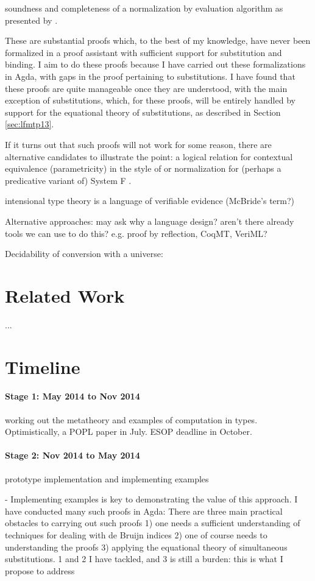 \documentclass{article}
\begin{document}
soundness and completeness of a normalization by evaluation algorithm
as presented by \cite{Dybjer00}. 

These are substantial proofs which, to the best of my knowledge, have never been
formalized in a proof assistant with sufficient support for
substitution and binding. I aim to do these proofs because I have carried out these formalizations in
Agda, with gaps in the proof pertaining to substitutions. I have found
that these proofs are quite manageable once they are understood, with
the main exception of substitutions, which, for these proofs, will be
entirely handled by support for the equational theory of
substitutions, as described in Section \ref{sec:lfmtp13}.

If it turns out that such proofs will not work for some reason, there
are alternative candidates to illustrate the point: a logical relation
for contextual equivalence (parametricity) in the style of
\cite{Dreyer11} or normalization for (perhaps a predicative variant
of) System F \citep{ProofsAndTypes,Altenkirch93}.

intensional type theory is a language of verifiable evidence
(McBride's term?)

Alternative approaches: may ask why a language design? aren't there
already tools we can use to do this? e.g. proof by reflection, CoqMT,
VeriML?

Decidability of conversion with a universe: \cite{Abel07}

\section{Related Work}
...

\section{Timeline}
\paragraph{Stage 1:  May 2014 to Nov 2014} working out the metatheory and examples of computation in
types. Optimistically, a POPL paper in July. ESOP deadline in
October. 

\paragraph{Stage 2: Nov 2014 to May 2014} prototype implementation and implementing examples

 - Implementing examples is key to demonstrating the value of this
 approach. I have conducted many such proofs in Agda: There are three
 main practical obstacles to carrying out such proofs 1) one needs a
 sufficient understanding of techniques for dealing with de Bruijn
 indices 2) one of course needs to understanding the proofs 3)
 applying the equational theory of simultaneous substitutions. 1 and 2
 I have tackled, and 3 is still a burden: this is what I propose to
 address
\end{document}
